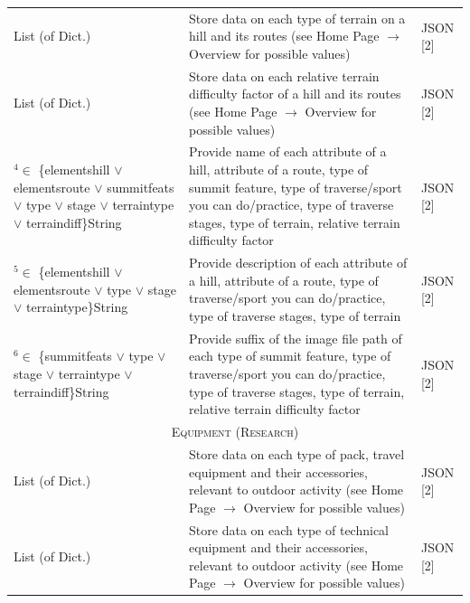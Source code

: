 \documentclass[11pt, english]{article}
\begin{document}
\begin{center}
\begin{longtable}{p{4cm}p{5cm}p{4cm}}
		\fbox{terraintype}\newline List (of Dict.) & Store data on each type of terrain on a hill and its routes (see Home Page $\rightarrow$ Overview for possible values) & JSON [2]\\
		\fbox{terraindiff}\newline List (of Dict.) & Store data on each relative terrain difficulty factor of a hill and its routes (see Home Page $\rightarrow$ Overview for possible values) & JSON [2]\\
		\fbox{name}$^4$\newline $\in$ \{elementshill $\lor$ elementsroute $\lor$ summitfeats $\lor$ type $\lor$ stage $\lor$ terraintype $\lor$ terraindiff\}\newline String & Provide name of each attribute of a hill, attribute of a route, type of summit feature, type of traverse/sport you can do/practice, type of traverse stages, type of terrain, relative terrain difficulty factor & JSON [2]\\
		\fbox{desc}$^5$\newline $\in$ \{elementshill $\lor$ elementsroute $\lor$ type $\lor$ stage $\lor$ terraintype\}\newline String & Provide description of each attribute of a hill, attribute of a route, type of traverse/sport you can do/practice, type of traverse stages, type of terrain & JSON [2]\\
		\fbox{image}$^6$\newline $\in$ \{summitfeats $\lor$ type $\lor$ stage $\lor$ terraintype $\lor$ terraindiff\}\newline String & Provide suffix of the image file path of each type of summit feature, type of traverse/sport you can do/practice, type of traverse stages, type of terrain, relative terrain difficulty factor & JSON [2]\\
		\hline
		\multicolumn{3}{c}{\textsc{Equipment (Research)}}\\
		\hline
		\fbox{packs}\newline List (of Dict.) & Store data on each type of pack, travel equipment and their accessories, relevant to outdoor activity (see Home Page $\rightarrow$ Overview for possible values) & JSON [2]\\
		\fbox{technical}\newline List (of Dict.) & Store data on each type of technical equipment and their accessories, relevant to outdoor activity (see Home Page $\rightarrow$ Overview for possible values) & JSON [2]\\

\end{longtable}
\end{center}
\end{document}
